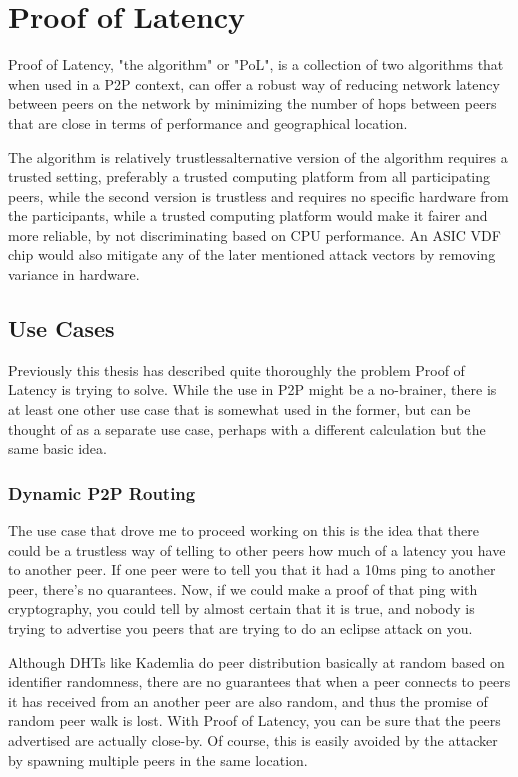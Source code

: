 \chapter{Proof of Latency}
\label{Proof of Latency}
Proof of Latency, "the algorithm" or "PoL", is a collection of two algorithms that when used in a P2P context, can offer a robust way of reducing network latency between peers on the network by minimizing the number of hops between peers that are close in terms of performance and geographical location.

The algorithm is relatively trustlessalternative version of the algorithm requires a trusted setting, preferably a trusted computing platform from all participating peers, while the second version is trustless and requires no specific hardware from the participants, while a trusted computing platform would make it fairer and more reliable, by not discriminating based on CPU performance. An ASIC VDF chip would also mitigate any of the later mentioned attack vectors by removing variance in hardware.

\section{Use Cases}
Previously this thesis has described quite thoroughly the problem Proof of Latency is trying to solve. While the use in P2P might be a no-brainer, there is at least one other use case that is somewhat used in the former, but can be thought of as a separate use case, perhaps with a different calculation but the same basic idea.

\subsection{Dynamic P2P Routing}
The use case that drove me to proceed working on this is the idea that there could be a trustless way of telling to other peers how much of a latency you have to another peer. If one peer were to tell you that it had a 10ms ping to another peer, there's no quarantees. Now, if we could make a proof of that ping with cryptography, you could tell by almost certain that it is true, and nobody is trying to advertise you peers that are trying to do an eclipse attack on you.

Although DHTs like Kademlia do peer distribution basically at random based on identifier randomness, there are no guarantees that when a peer connects to peers it has received from an another peer are also random, and thus the promise of random peer walk is lost. With Proof of Latency, you can be sure that the peers advertised are actually close-by. Of course, this is easily avoided by the attacker by spawning multiple peers in the same location.

